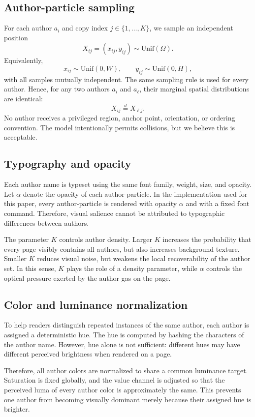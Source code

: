 \documentclass[10pt,letterpaper]{article}
\theoremstyle{definition}
\theoremstyle{remark}
\begin{document}
\subsection{Author-particle sampling}

For each author $a_i$ and copy index $j\in\{1,\ldots,K\}$, we sample an independent position
\[
X_{ij}=(x_{ij},y_{ij}) \sim \mathrm{Unif}(\Omega).
\]
Equivalently,
\[
x_{ij}\sim \mathrm{Unif}(0,W),\qquad
y_{ij}\sim \mathrm{Unif}(0,H),
\]
with all samples mutually independent. The same sampling rule is used for every author. Hence, for any two authors $a_i$ and $a_\ell$, their marginal spatial distributions are identical:
\[
X_{ij}\overset{d}{=}X_{\ell j}.
\]
No author receives a privileged region, anchor point, orientation, or ordering convention.
The model intentionally permits collisions, but we believe this is acceptable.

\subsection{Typography and opacity}

Each author name is typeset using the same font family, weight, size, and opacity. Let $\alpha$ denote the opacity of each author-particle. In the implementation used for this paper, every author-particle is rendered with opacity $\alpha$ and with a fixed font command. Therefore, visual salience cannot be attributed to typographic differences between authors.

The parameter $K$ controls author density. Larger $K$ increases the probability that every page visibly contains all authors, but also increases background texture. Smaller $K$ reduces visual noise, but weakens the local recoverability of the author set. In this sense, $K$ plays the role of a density parameter, while $\alpha$ controls the optical pressure exerted by the author gas on the page.

\subsection{Color and luminance normalization}

To help readers distinguish repeated instances of the same author, each author is assigned a deterministic hue. The hue is computed by hashing the characters of the author name. However, hue alone is not sufficient: different hues may have different perceived brightness when rendered on a page.

Therefore, all author colors are normalized to share a common luminance target. Saturation is fixed globally, and the value channel is adjusted so that the perceived luma of every author color is approximately the same. This prevents one author from becoming visually dominant merely because their assigned hue is brighter.
\end{document}
